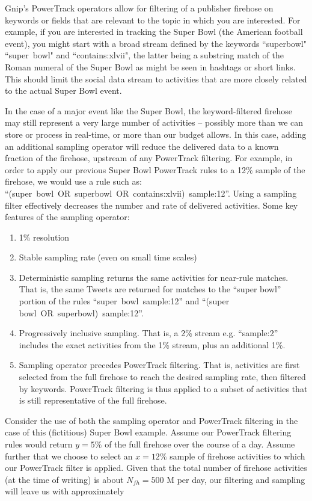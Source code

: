 \documentclass{article}
\begin{document}
Gnip's PowerTrack operators allow for filtering of a publisher firehose on keywords or fields that are 
relevant to the topic in which you are interested. For example, if you are interested in tracking the 
Super Bowl (the American football event), you might start with a broad stream defined by the 
keywords ``superbowl" ``super~bowl" 
and ``contains:xlvii", the latter being a substring match of the Roman numeral of the Super Bowl as 
might be seen in hashtags or short links. This should limit the social data stream to activities that are 
more closely related to the actual Super Bowl event. 

In the case of a major event like the Super Bowl, the keyword-filtered firehose may still represent a 
very large number of activities -- possibly more than we can store or process in real-time, or more than 
our budget allows. In this case, adding an additional sampling operator will reduce the delivered data 
to a known fraction of the firehose, upstream of any PowerTrack filtering. 
For example, in order to apply our previous Super 
Bowl PowerTrack rules to a 12\% sample of the firehose, we would use a rule such as: 
``(super~bowl~OR~superbowl~OR~contains:xlvii)~sample:12''. Using a sampling filter effectively decreases 
the number and rate of delivered activities. Some key features of the sampling operator:

\begin{enumerate}
	\item 1\% resolution
	\item Stable sampling rate (even on small time scales)
	\item Deterministic sampling returns the same activities for near-rule matches.  That is, the same 
Tweets are returned for matches to the ``super bowl'' portion of the rules ``super~bowl~sample:12'' and 
``(super bowl~OR~superbowl)~sample:12''.
	\item Progressively inclusive sampling. That is, a 2\% stream e.g. ``sample:2'' includes the exact 
activities from	the 1\% stream, plus an additional 1\%.
	\item Sampling operator precedes PowerTrack filtering. That is, activities are first selected 
from the full firehose to reach the desired sampling rate, then filtered by keywords. 
PowerTrack filtering is thus applied to a subset of activities that is still representative 
of the full firehose.
\end{enumerate}


Consider the use of both the sampling operator and PowerTrack filtering in the case of this (fictitious) 
Super Bowl example. Assume our PowerTrack filtering rules would return $y=5\%$ of the full firehose over the 
course of a day. Assume further that we choose to select an $x=12\%$ sample of firehose activities 
to which our PowerTrack filter is applied. Given that the total number of firehose activities (at the time 
of writing) is about $N_{fh}=500$ M per day, our filtering and sampling will leave us with approximately
\end{document}
